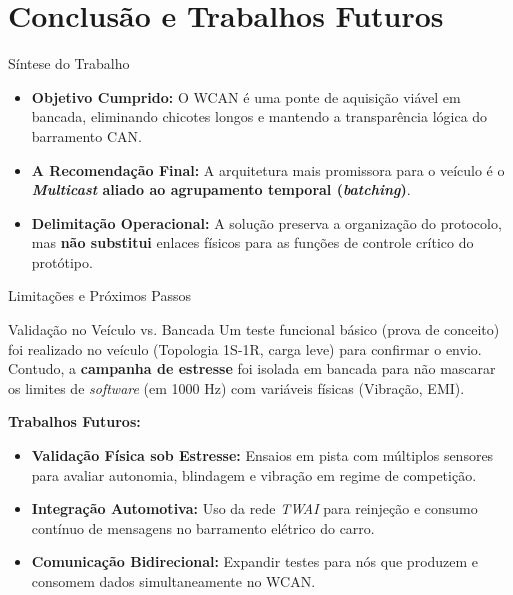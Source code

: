 \section{Conclusão e Trabalhos Futuros}

\begin{frame}{Síntese do Trabalho}
    \begin{itemize}
        \item \textbf{Objetivo Cumprido:} O WCAN é uma ponte de aquisição viável em bancada, eliminando chicotes longos e mantendo a transparência lógica do barramento CAN.
        \item \textbf{A Recomendação Final:} A arquitetura mais promissora para o veículo é o \textbf{\textit{Multicast} aliado ao agrupamento temporal (\textit{batching})}.
        \item \textbf{Delimitação Operacional:} A solução preserva a organização do protocolo, mas \textbf{não substitui} enlaces físicos para as funções de controle crítico do protótipo.
    \end{itemize}
\end{frame}

\begin{frame}{Limitações e Próximos Passos}
    \begin{alertblock}{Validação no Veículo vs. Bancada}
        Um teste funcional básico (prova de conceito) foi realizado no veículo (Topologia 1S-1R, carga leve) para confirmar o envio. Contudo, a \textbf{campanha de estresse} foi isolada em bancada para não mascarar os limites de \textit{software} (em 1000 Hz) com variáveis físicas (Vibração, EMI).
    \end{alertblock}

    \vspace{0.4cm}
    \textbf{Trabalhos Futuros:}
    \begin{itemize}
        \item \textbf{Validação Física sob Estresse:} Ensaios em pista com múltiplos sensores para avaliar autonomia, blindagem e vibração em regime de competição.
        \item \textbf{Integração Automotiva:} Uso da rede \textit{TWAI} para reinjeção e consumo contínuo de mensagens no barramento elétrico do carro.
        \item \textbf{Comunicação Bidirecional:} Expandir testes para nós que produzem e consomem dados simultaneamente no WCAN.
    \end{itemize}
\end{frame}
